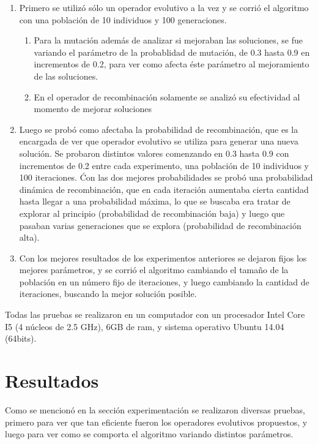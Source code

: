 \documentclass[letter, 10pt]{article}
\begin{document}
\begin{enumerate}
\item Primero se utilizó sólo un operador evolutivo a la vez y se corrió el algoritmo con una población de 10 individuos y 100 generaciones.
    \begin{enumerate}
        \item Para la mutación además de analizar si mejoraban las soluciones, se fue variando el parámetro de la probablidad de mutación, de 0.3 hasta 0.9 en incrementos de 0.2, para ver como afecta éste parámetro al mejoramiento de las soluciones.
        \item En el operador de recombinación solamente se analizó su efectividad al momento de mejorar soluciones
    \end{enumerate}

\item Luego se probó como afectaba la probabilidad de recombinación, que es la encargada de ver que operador evolutivo se utiliza para generar una nueva solución. Se probaron distintos valores comenzando en 0.3 hasta 0.9 con incrementos de 0.2 entre cada experimento, una población de 10 individuos y 100 iteraciones. Ćon las dos mejores probabilidades se probó una probabilidad dinámica de recombinación, que en cada iteración aumentaba cierta cantidad hasta llegar a una probabilidad máxima, lo que se buscaba era tratar de explorar al principio (probabilidad de recombinación baja) y luego que pasaban varias generaciones que se explora (probabilidad de recombinación alta).

\item Con los mejores resultados de los experimentos anteriores se dejaron fijos los mejores parámetros, y se corrió el algoritmo cambiando el tamaño de la población en un número fijo de iteraciones, y luego cambiando la cantidad de iteraciones, buscando la mejor solución posible.
\end{enumerate}

Todas las pruebas se realizaron en un computador con un procesador Intel Core I5 (4 núcleos de 2.5 GHz), 6GB de ram, y sistema operativo Ubuntu 14.04 (64bits).

\section{Resultados}

Como se mencionó en la sección experimentación se realizaron diversas pruebas, primero para ver que tan eficiente fueron los operadores evolutivos propuestos, y luego para ver como se comporta el algoritmo variando distintos parámetros.
\end{document}
